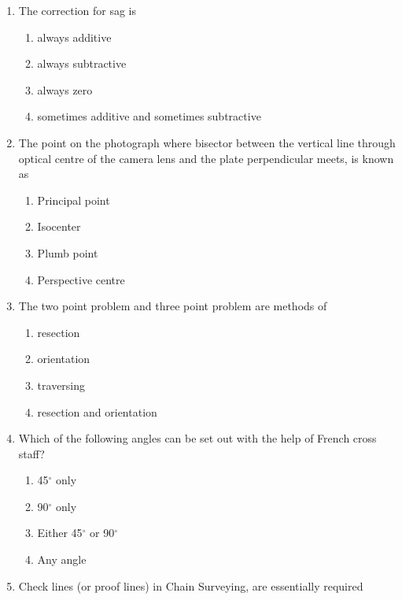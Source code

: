 \documentclass[11pt,a4paper]{article}
\begin{document}
\begin{enumerate}
{}
\item{The correction for sag is}
\begin{enumerate}[label=\Alph*.]
\item{always additive}
\item{always subtractive}
\item{always zero}
\item{sometimes additive and sometimes subtractive}
\end{enumerate}
\item{The point on the photograph where bisector between the vertical line through optical centre of the camera lens and the plate perpendicular meets, is known as}
\begin{enumerate}[label=\Alph*.]
\item{Principal point}
\item{Isocenter}
\item{Plumb point}
\item{Perspective centre}
\end{enumerate}
\item{The two point problem and three point problem are methods of}
\begin{enumerate}[label=\Alph*.]
\item{resection}
\item{orientation}
\item{traversing}
\item{resection and orientation}
\end{enumerate}
\item{Which of the following angles can be set out with the help of French cross staff?}
\begin{enumerate}[label=\Alph*.]
\item{45$^\circ$ only}
\item{90$^\circ$ only}
\item{Either 45$^\circ$ or 90$^\circ$}
\item{Any angle}
\end{enumerate}
\item{Check lines (or proof lines) in Chain Surveying, are essentially required}
\begin{enumerate}[label=\Alph*.]

\end{enumerate}
\end{enumerate}
\end{document}
